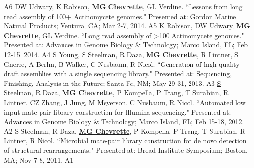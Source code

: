 \begin{cvpubs}
    {A6} %
  \cvpub
    {\underline{DW Udwary}, K Robison, \textbf{MG Chevrette}, GL Verdine. ``Lessons from long read assembly of 100+ Actinomycete genomes." Presented at: Gordon Marine Natural Products; Ventura, CA; Mar 2-7, 2014.} %
    {A5} %
  \cvpub
    {\underline{K Robison}, DW Udwary, \textbf{MG Chevrette}, GL Verdine. ``Long read assembly of >100 Actinomycete genomes." Presented at: Advances in Genome Biology \& Technology; Marco Island, FL; Feb 12-15, 2014.} %
    {A4} %
  \cvpub
    {\underline{S Young}, S Steelman, R Daza, \textbf{MG Chevrette}, R Lintner, S Gnerre, A Berlin, B Walker, C Nusbaum, R Nicol. ``Generation of high-quality draft assemblies with a single sequencing library." Presented at: Sequencing, Finishing, Analysis in the Future; Santa Fe, NM; May 29-31, 2013.} %
    {A3} %
  \cvpub
    {\underline{S Steelman}, R Daza, \textbf{MG Chevrette}, P Kompella, P Trang, T Surabian, R Lintner, CZ Zhang, J Jung, M Meyerson, C Nusbaum, R Nicol. ``Automated low input mate-pair library construction for Illumina sequencing." Presented at: Advances in Genome Biology \& Technology; Marco Island, FL; Feb 15-18, 2012.} %
    {A2} %
  \cvpub
    {S Steelman, R Daza, \underline{\textbf{MG Chevrette}}, P Kompella, P Trang, T Surabian, R Lintner, R Nicol. ``Microbial mate-pair library construction for de novo detection of structural rearrangements." Presented at: Broad Institute Symposium; Boston, MA; Nov 7-8, 2011.} %
    {A1} %
\end{cvpubs}